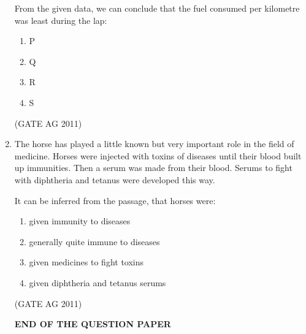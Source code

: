 \documentclass[journal,12pt,onecolumn]{IEEEtran}
\theoremstyle{remark}
\begin{document}
\begin{enumerate}
From the given data, we can conclude that the fuel consumed per kilometre was least during the lap:  

\begin{enumerate}
\item P
\item Q
\item R
\item S
\end{enumerate}
\hfill{(GATE AG 2011)}

\item The horse has played a little known but very important role in the field of medicine. 
Horses were injected with toxins of diseases until their blood built up immunities. Then a serum was made from their blood. Serums to fight with diphtheria and tetanus were developed this way.  

It can be inferred from the passage, that horses were:  

\begin{enumerate}
\item given immunity to diseases
\item generally quite immune to diseases
\item given medicines to fight toxins
\item given diphtheria and tetanus serums
\end{enumerate}
\hfill{(GATE AG 2011)}


\begin{center}
\textbf{END OF THE QUESTION PAPER}
\end{center}






\end{enumerate}
\end{document}
